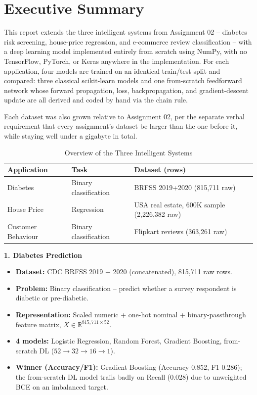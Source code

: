 \documentclass[11pt, a4paper]{article}
\begin{document}
\section{Executive Summary}

This report extends the three intelligent systems from Assignment 02 -- diabetes risk
screening, house-price regression, and e-commerce review classification -- with a deep
learning model implemented entirely from scratch using NumPy, with no TensorFlow, PyTorch,
or Keras anywhere in the implementation. For each application, four models are trained on
an identical train/test split and compared: three classical scikit-learn models and one
from-scratch feedforward network whose forward propagation, loss, backpropagation, and
gradient-descent update are all derived and coded by hand via the chain rule.

Each dataset was also grown relative to Assignment 02, per the separate verbal requirement
that every assignment's dataset be larger than the one before it, while staying well under
a gigabyte in total.

\begin{table}[H]
\centering
\begin{tabular}{lll}
\toprule
\textbf{Application} & \textbf{Task} & \textbf{Dataset (rows)} \\
\midrule
Diabetes & Binary classification & BRFSS 2019+2020 (815,711 raw) \\
House Price & Regression & USA real estate, 600K sample (2,226,382 raw) \\
Customer Behaviour & Binary classification & Flipkart reviews (363,261 raw) \\
\bottomrule
\end{tabular}
\caption{Overview of the Three Intelligent Systems}
\end{table}

\textbf{1. Diabetes Prediction}
\begin{itemize}
    \item \textbf{Dataset:} CDC BRFSS 2019 + 2020 (concatenated), 815,711 raw rows.
    \item \textbf{Problem:} Binary classification -- predict whether a survey respondent is
    diabetic or pre-diabetic.
    \item \textbf{Representation:} Scaled numeric + one-hot nominal + binary-passthrough
    feature matrix, $X \in \mathbb{R}^{815,711 \times 52}$.
    \item \textbf{4 models:} Logistic Regression, Random Forest, Gradient Boosting,
    from-scratch DL ($52 \to 32 \to 16 \to 1$).
    \item \textbf{Winner (Accuracy/F1):} Gradient Boosting (Accuracy 0.852, F1 0.286); the
    from-scratch DL model trails badly on Recall (0.028) due to unweighted BCE on an
    imbalanced target.
\end{itemize}
\end{document}
